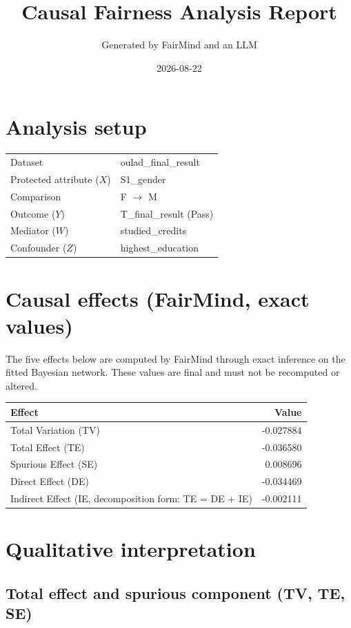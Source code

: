 \documentclass[11pt]{article}
\title{Causal Fairness Analysis Report}
\author{Generated by FairMind and an LLM}
\date{2026-08-22}
\begin{document}
\maketitle

\section{Analysis setup}

\begin{tabular}{ll}
\toprule
Dataset & oulad\_final\_result \\
Protected attribute ($X$) & S1\_gender \\
Comparison & F $\to$ M \\
Outcome ($Y$) & T\_final\_result (Pass) \\
Mediator ($W$) & studied\_credits \\
Confounder ($Z$) & highest\_education \\
\bottomrule
\end{tabular}

\section{Causal effects (FairMind, exact values)}

The five effects below are computed by FairMind through exact inference on the
fitted Bayesian network. These values are final and must not be recomputed or
altered.

\begin{tabular}{lr}
\toprule
Effect & Value \\
\midrule
Total Variation (TV) & -0.027884 \\
Total Effect (TE) & -0.036580 \\
Spurious Effect (SE) & 0.008696 \\
Direct Effect (DE) & -0.034469 \\
Indirect Effect (IE, decomposition form: TE = DE + IE) & -0.002111 \\
\bottomrule
\end{tabular}

\section{Qualitative interpretation}

\subsection{Total effect and spurious component (TV, TE, SE)}
\end{document}
